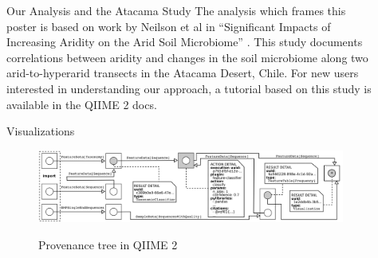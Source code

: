 \documentclass[final]{beamer}
\newlength{\sepwidth}
\newlength{\colwidth}
\newcommand{\separatorcolumn}{\begin{column}{\sepwidth}\end{column}}
\begin{document}
\begin{frame}[t]
\begin{columns}[t]
\begin{column}{\colwidth}
\end{column}

\separatorcolumn

\begin{column}{\colwidth}

  \begin{block}{Our Analysis and the Atacama Study}
    The analysis which frames this poster is based on work by Neilson et al in
    “Significant Impacts of Increasing Aridity on the Arid Soil Microbiome”
    \cite{Neilsone00195-16}. This study documents correlations between aridity
    and changes in the soil microbiome along two arid-to-hyperarid transects in
    the Atacama Desert, Chile. For new users interested in understanding
    our approach, a tutorial based on this study is available in the
    QIIME 2 docs.
  \end{block}

  \begin{block}{Visualizations}
    \begin{figure}[tph!]
      {\includegraphics[width=\linewidth]{assets/provenance}}
      \caption{Provenance tree in QIIME 2}
      \label{fig:provenance}
    \end{figure}


\end{block}
\end{column}
\end{columns}
\end{frame}
\end{document}
